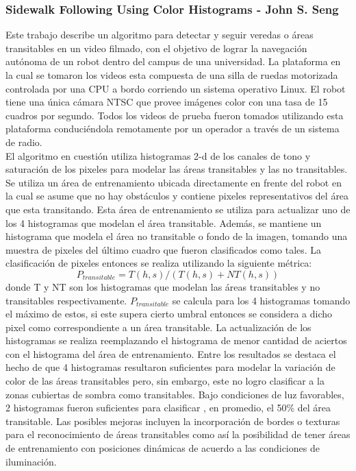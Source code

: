 	\subsubsection{\label{sec:sidewalk} Sidewalk Following Using Color Histograms - John S. Seng}
	Este trabajo describe un algoritmo  para detectar y seguir 
	veredas o áreas transitables en un video filmado, con el objetivo de 
	lograr la navegación autónoma de un robot dentro del 
	campus de una universidad. La plataforma en la cual se tomaron los videos esta 
	compuesta de una silla de ruedas motorizada controlada por una CPU 
	a bordo corriendo un sistema operativo Linux. El robot tiene una 
	única cámara NTSC que provee imágenes color con una tasa de 15 
	cuadros por segundo. Todos los videos de prueba fueron tomados 
	utilizando esta plataforma conduciéndola remotamente por un 
	operador a través de un sistema de radio.\\
	\indent El algoritmo en cuestión utiliza histogramas 2-d de los 
	canales de tono y saturación de los pixeles para modelar las áreas
	transitables y las no transitables. Se utiliza un área de 
	entrenamiento ubicada directamente en frente del robot en la cual se asume que 
	no hay obstáculos y contiene pixeles representativos del área que 
	esta transitando. Esta área de entrenamiento se utiliza para 
	actualizar uno de los 4 histogramas que modelan el área 
	transitable. Además, se mantiene un histograma que modela el
	área no transitable o fondo de la imagen, tomando una muestra de pixeles del último 
	cuadro que fueron clasificados como tales. La 
	clasificación de pixeles entonces se realiza utilizando la 
	siguiente métrica:
	\[
	P_{transitable}= T(h,s)/ ( T(h,s) + NT(h,s))
	\]
	donde T y NT son los histogramas que modelan las áreas transitables
	y no transitables respectivamente. $P_{transitable}$ se calcula para 
	los 4 histogramas tomando el máximo de estos, si este supera 
	cierto umbral entonces se considera a dicho pixel como 
	correspondiente a un área transitable.
	La actualización de los histogramas se realiza reemplazando el 
	histograma de menor cantidad de aciertos con el histograma 
	del área de entrenamiento.  Entre los resultados se destaca el 
	hecho de que 4 histogramas resultaron suficientes para modelar la
	variación de color de las áreas transitables pero, sin embargo, este no 
	logro clasificar a la zonas cubiertas de sombra como transitables.
	Bajo condiciones de luz favorables, 2 histogramas fueron 
	suficientes para clasificar , en promedio, el 50\% del área 
	transitable. Las posibles mejoras incluyen la incorporación de 
	bordes o texturas para el reconocimiento de áreas transitables 
	como así la posibilidad de tener áreas de entrenamiento con 
	posiciones dinámicas de acuerdo a las condiciones de iluminación.
	
